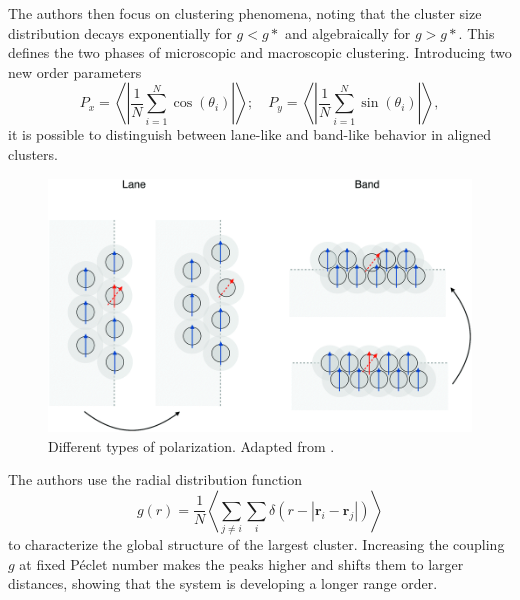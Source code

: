 \documentclass[../../master_thesis_np.tex]{subfiles}
\begin{document}
	The authors then focus on clustering phenomena, noting that the cluster size distribution decays exponentially for $g < g*$ and algebraically for $g > g*$. 
	This defines the two phases of microscopic and macroscopic clustering.
	Introducing two new order parameters
	\begin{equation} 
	P_x = \left\langle \left| \frac{1}{N} \sum_{i=1}^N \cos(\theta_i) \right| \right\rangle ; \quad
	P_y = \left\langle \left| \frac{1}{N} \sum_{i=1}^N \sin(\theta_i) \right| \right\rangle,
 	\end{equation}
 	it is possible to distinguish between lane-like and band-like behavior in aligned clusters.
 
	 \begin{figure}[htp]
		 	\centering
		 	\includegraphics[width=\singfigwidth]{martin_laneband.png}
		 	\caption{Different types of polarization. Adapted from \cite{martin-gomez_collective_2018}.}
		 	\label{fig:martin_flocking2}
	 \end{figure}
	 
	 The authors use the radial distribution function 
	 \begin{equation} 
	 g(r) = \frac{1}{N} \left\langle \sum_{j \neq i} \sum_{i} \delta \left( r - |\mathbf{r}_i - \mathbf{r}_j| \right) \right\rangle
	 \end{equation}
	to characterize the global structure of the largest cluster. 
	Increasing the coupling $g$ at fixed Péclet number makes the peaks higher and shifts them to larger distances, showing that the system is developing a longer range order.
	
\end{document}

